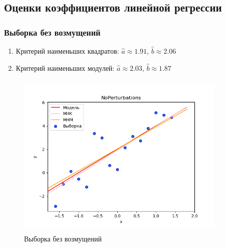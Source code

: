 \subsection{Оценки коэффициентов линейной регрессии}
	\subsubsection{Выборка без возмущений}
		\begin{enumerate}
			\item{Критерий наименьших квадратов:}
			$\hat{a}\approx 1.91$, $\hat{b}\approx 2.06$
			\item{Критерий наименьших модулей:}
			$\hat{a}\approx 2.03$, $\hat{b}\approx 1.87$
		\end{enumerate}
		\begin{figure}[H]
			\centering
			\includegraphics[width = 10cm, height = 8cm]{pics/NoPerturbations.png}
			\caption{Выборка без возмущений}
			\label{w/o_pert}
		\end{figure}
	
